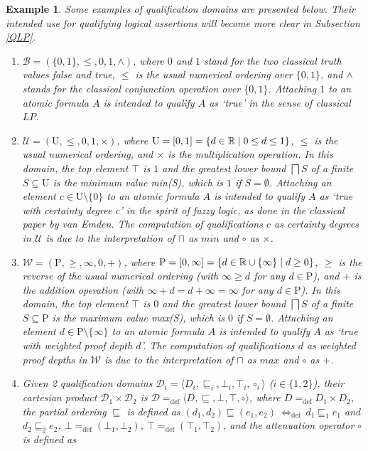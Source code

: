 \documentclass{sigplanconf}
\newcommand{\qdom}{\mathcal{D}} \newcommand{\dqdom}{D \setminus \{\bot\}} \newcommand{\bqdom}{(D \setminus \{\bot\}) \uplus \{?\}}
\newcommand{\B}{\mathcal{B}}
\newcommand{\U}{\mathcal{U}}
\newcommand{\W}{\mathcal{W}}
\newcommand{\simrel}{\mathcal{R}}
\newcommand{\diff}{~{\Longleftrightarrow_{\mathrm{def}}}~} \newcommand{\eqdef}{~{=_{\mathrm{def}}}~} \newcommand{\tmin}{{\vartriangle}} \newcommand{\tmax}{\triangledown} \newcommand{\union}{\bigcup} \newcommand{\inter}{\bigcap} \newcommand{\supr}{\bigsqcup} \newcommand{\infi}{\bigsqcap} \newcommand{\Dentail}{~{\succcurlyeq_{\qdom}}~} \newcommand{\DentailSim}{~{\succcurlyeq_{(\simrel,\qdom)}}~} \newcommand{\app}{~{\hat{}}~}
\theoremstyle{definition}
\theoremstyle{plain}
\newtheorem{example}{Example}
\begin{document}
\begin{example} \label{someDomains}
Some examples of  qualification domains are presented below. Their intended use for qualifying logical assertions will become more clear in Subsection \ref{QLP}.
\begin{enumerate}
\item
$\B = (\{0,1\}, \le, 0, 1, \land)$, where $0$ and $1$ stand for the two classical truth values  \emph{false} and \emph{true}, $\leq$ is the usual numerical ordering over $\{0,1\}$, and $\land$ stands for the classical conjunction operation over $\{0,1\}$. Attaching $1$ to  an atomic formula  $A$ is intended to qualify $A$ as `true' in the sense of classical $LP$.
\item
$\U = (\mbox{U}, \leq, 0, 1,\times)$, where $\mbox{U} = [0,1] = \{d \in \mathbb{R} \mid 0 \le d \le 1\}$, $\le$ is the usual numerical ordering, and $\times$ is the multiplication operation. In this domain,  the top element $\top$ is $1$ and the greatest lower bound $\bigsqcap S$ of a finite $S \subseteq \mbox{U}$ is the minimum value min(S), which is $1$ if $S = \emptyset$. Attaching an  element $c \in \mbox{U} \setminus \{0\}$  to an atomic formula  $A$ is intended to qualify $A$ as `true with certainty  degree $c$' in the spirit of fuzzy logic, as done in the classical paper \cite{VE86} by van Emden. The computation of qualifications $c$ as certainty degrees in $\U$ is due to the interpretation of $\sqcap$ as $min$ and $\circ$ as $\times$.
\item
$\W = (\mbox{P}, \ge, \infty, 0, +)$, where $\mbox{P} = [0,\infty] = \{d \in \mathbb{R} \cup \{\infty\} \mid d \ge 0\}$, $\geq$ is the reverse of the usual numerical ordering (with $\infty \ge d$ for any $d \in \mbox{P}$), and $+$ is the addition operation (with $\infty + d = d + \infty = \infty$ for any $d \in \mbox{P}$). In this domain,  the top element $\top$ is $0$ and the greatest lower bound $\bigsqcap S$ of a finite $S \subseteq \mbox{P}$ is the maximum value max(S), which is $0$ if $S = \emptyset$. Attaching an element $d \in \mbox{P} \setminus \{\infty\}$ to an atomic formula $A$ is intended to qualify $A$ as `true with weighted proof depth $d$'. The computation of qualifications $d$ as weighted proof depths in $\W$ is due to the interpretation  of $\sqcap$ as $max$ and $\circ$ as $+$.
\item
Given 2 qualification domains  $\qdom_i=\langle D_i, \sqsubseteq_i, \bot_i, \top_i, \circ_i \rangle$ ($i \in \{1, 2\}$), their {\em cartesian product} $\qdom_1 \times \qdom_2$ is $\qdom =_{\mathrm{def}} \langle D, \sqsubseteq, \bot, \top, \circ \rangle$, where  $D =_{\mathrm{def}} D_1 \times D_2$, the partial ordering $\sqsubseteq$ is defined as $(d_1,d_2) \sqsubseteq (e_1,e_2) \diff d_1 \sqsubseteq_1 e_1$ and $d_2 \sqsubseteq_2 e_2$, $\bot =_{\mathrm{def}} (\bot_1, \bot_2)$, $\top =_{\mathrm{def}} (\top_1, \top_2)$, and the attenuation operator $\circ$ is defined as

\end{enumerate}
\end{example}
\end{document}

